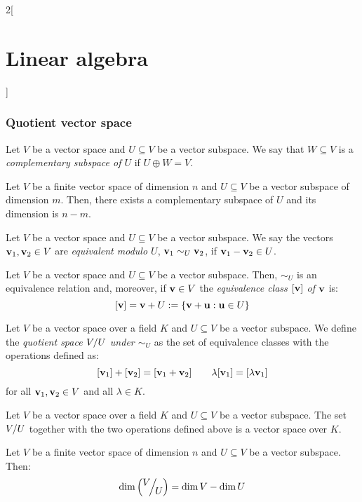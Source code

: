 \documentclass[../../../main.tex]{subfiles}
\begin{document}
\begin{multicols}{2}[\section{Linear algebra}]
    \subsubsection*{Quotient vector space}
    \begin{definition}
        Let $V$ be a vector space and $U\subseteq V$ be a vector subspace. We say that $W\subseteq V$ is a \textit{complementary subspace of $U$} if $U\oplus W=V$.
    \end{definition}
    \begin{definition}
        Let $V$ be a finite vector space of dimension $n$ and $U\subseteq V$ be a vector subspace of dimension $m$. Then, there exists a complementary subspace of $U$ and its dimension is $n-m$.
    \end{definition}
    \begin{definition}
        Let $V$ be a vector space and $U\subseteq V$ be a vector subspace. We say the vectors $\boldsymbol{\mathrm{v}}_1,\boldsymbol{\mathrm{v}}_2\in V$ are \textit{equivalent modulo $U$}, $\boldsymbol{\mathrm{v}}_1\sim_U\boldsymbol{\mathrm{v}}_2$, if $\boldsymbol{\mathrm{v}}_1-\boldsymbol{\mathrm{v}}_2\in U$.
    \end{definition}
    \begin{lemma}
        Let $V$ be a vector space and $U\subseteq V$ be a vector subspace. Then, $\sim_U$ is an equivalence relation and, moreover, if $\boldsymbol{\mathrm{v}}\in V$ the \textit{equivalence class $[\boldsymbol{\mathrm{v}}]$ of $\boldsymbol{\mathrm{v}}$} is: $$[\boldsymbol{\mathrm{v}}]=\boldsymbol{\mathrm{v}}+U:=\{\boldsymbol{\mathrm{v}}+\boldsymbol{\mathrm{u}}:\boldsymbol{\mathrm{u}}\in U\}$$
    \end{lemma}
    \begin{definition}
        Let $V$ be a vector space over a field $K$ and $U\subseteq V$ be a vector subspace. We define the \textit{quotient space $\quot{V}{U}$ under $\sim_U$} as the set of equivalence classes with the operations defined as:
        $$[\boldsymbol{\mathrm{v}}_1]+[\boldsymbol{\mathrm{v}}_2]=[\boldsymbol{\mathrm{v}}_1+\boldsymbol{\mathrm{v}}_2]\qquad \lambda[\boldsymbol{\mathrm{v}}_1]=[\lambda\boldsymbol{\mathrm{v}}_1]$$
        for all $\boldsymbol{\mathrm{v}}_1,\boldsymbol{\mathrm{v}}_2\in V$ and all $\lambda\in K$.
    \end{definition}
    \begin{prop}
        Let $V$ be a vector space over a field $K$ and $U\subseteq V$ be a vector subspace. The set $\quot{V}{U}$ together with the two operations defined above is a vector space over $K$.
    \end{prop}
    \begin{prop}
        Let $V$ be a finite vector space of dimension $n$ and $U\subseteq V$ be a vector subspace. Then: $$\dim\left(\quot{V}{U}\right)=\dim V-\dim U$$
    \end{prop}

\end{multicols}
\end{document}
